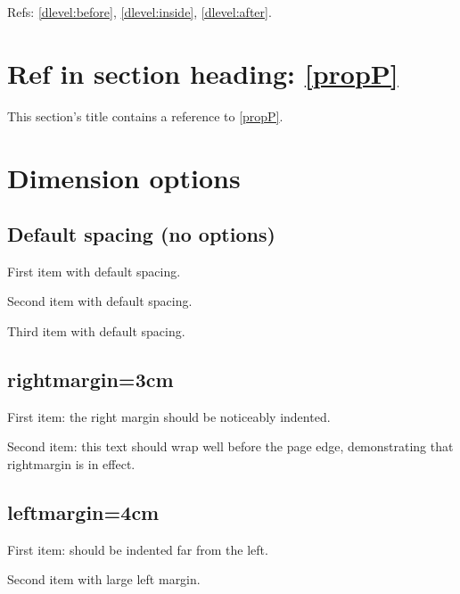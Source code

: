 \documentclass[leqno]{article}
\begin{document}
Refs: \ref{dlevel:before}, \ref{dlevel:inside}, \ref{dlevel:after}.

\section{Ref in section heading: \ref{propP}}

This section's title contains a reference to \ref{propP}.

\section{Dimension options}

\subsection{Default spacing (no options)}

\begin{prop}
    \item First item with default spacing.
    \item Second item with default spacing.
    \item Third item with default spacing.
\end{prop}

\subsection{rightmargin=3cm}

\begin{prop}
    \item First item: the right margin should be noticeably indented.
    \item Second item: this text should wrap well before the page edge,
    demonstrating that rightmargin is in effect.
\end{prop}

\subsection{leftmargin=4cm}

\begin{prop}
    \item First item: should be indented far from the left.
    \item Second item with large left margin.
\end{prop}
\end{document}
